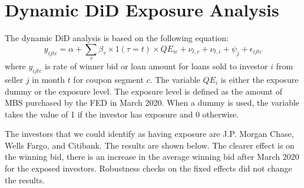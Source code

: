 \documentclass[11pt,a4paper]{article}
\begin{document}
\pagebreak
\section{Dynamic DiD Exposure Analysis}

The dynamic DiD analysis is based on the following equation:
$$y_{ijtc} = \alpha + \sum_\tau \beta_\tau \times 1({\tau}=t)  \times QE_{ic} + \nu_{t,c} + \nu_{t,i} +\psi_{j} + \epsilon_{ijtc}$$
where $y_{ijtc}$ is rate of winner bid or loan amount for loans sold to investor $i$ from seller $j$ in month $t$ for coupon segment $c$. The variable $QE_{i}$ is either the exposure dummy or the exposure level. The exposure level is defined as the amount of MBS purchased by the FED in March 2020. When a dummy is used, the variable takes the value of 1 if the investor has exposure and 0 otherwise. 

The investors that we could identify as having exposure are J.P. Morgan Chase, Wells Fargo, and Citibank. The results are shown below.  The clearer effect is on the winning bid, there is an increase in the average winning bid after March 2020 for the exposed investors. Robustness checks on the fixed effects did not change the results.
\end{document}
